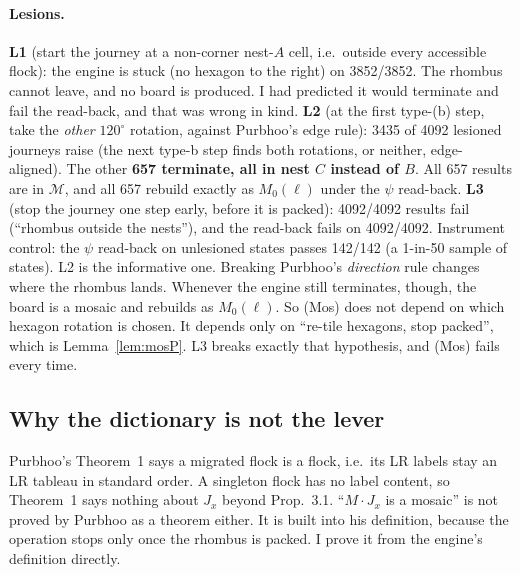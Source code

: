 \documentclass[11pt]{article}
\theoremstyle{definition}\newtheorem{definition}[theorem]{Definition}\newtheorem{remark}[theorem]{Remark}
\newcommand{\M}{\mathcal M}\newcommand{\F}{\mathcal F}
\begin{document}
\paragraph{Lesions.} \textbf{L1} (start the journey at a non-corner nest-$A$ cell, i.e.\ outside every accessible flock): the engine is stuck (no hexagon to the right) on 3852/3852. The rhombus cannot leave, and no board is produced. I had predicted it would terminate and fail the read-back, and that was wrong in kind. \textbf{L2} (at the first type-(b) step, take the \emph{other} $120^\circ$ rotation, against Purbhoo's edge rule): 3435 of 4092 lesioned journeys raise (the next type-b step finds both rotations, or neither, edge-aligned). The other \textbf{657 terminate, all in nest $C$ instead of $B$}. All 657 results are in $\M$, and all 657 rebuild exactly as $M_0(\ell)$ under the $\psi$ read-back. \textbf{L3} (stop the journey one step early, before it is packed): 4092/4092 results fail (``rhombus outside the nests''), and the read-back fails on 4092/4092. Instrument control: the $\psi$ read-back on unlesioned states passes 142/142 (a 1-in-50 sample of states).
L2 is the informative one. Breaking Purbhoo's \emph{direction} rule changes where the rhombus lands. Whenever the engine still terminates, though, the board is a mosaic and rebuilds as $M_0(\ell)$. So (Mos) does not depend on which hexagon rotation is chosen. It depends only on ``re-tile hexagons, stop packed'', which is Lemma~\ref{lem:mosP}. L3 breaks exactly that hypothesis, and (Mos) fails every time.

\subsection{Why the dictionary is not the lever}
Purbhoo's Theorem~1 says a migrated flock is a flock, i.e.\ its LR labels stay an LR tableau in standard order. A singleton flock has no label content, so Theorem~1 says nothing about $J_x$ beyond Prop.~3.1. ``$M\cdot J_x$ is a mosaic'' is not proved by Purbhoo as a theorem either. It is built into his definition, because the operation stops only once the rhombus is packed. I prove it from the engine's definition directly.
\end{document}
